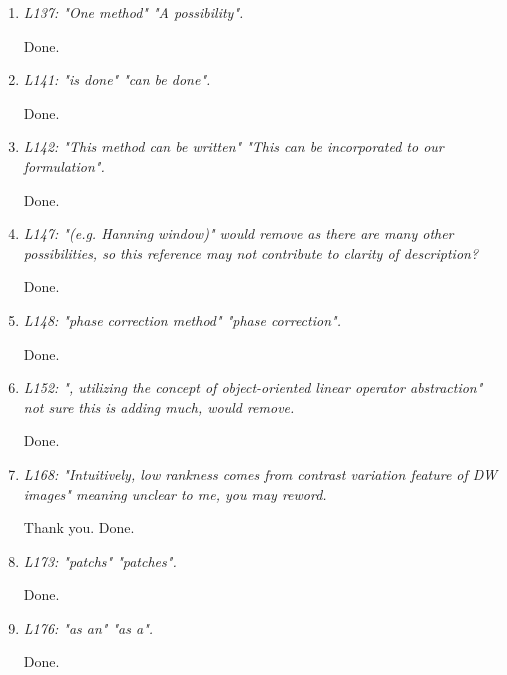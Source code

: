 \documentclass[a4paper,11pt,twoside]{report}
\begin{document}
\begin{enumerate}[resume]
    \item \textit{L137: "One method" \textrightarrow "A possibility".}

    \hspace{1em} Done.

    \item \textit{L141: "is done" \textrightarrow "can be done".}

    \hspace{1em} Done.

    \item \textit{L142: "This method can be written" \textrightarrow "This can be incorporated to our formulation".}

    \hspace{1em} Done.

    \item \textit{L147: "(e.g. Hanning window)" \textrightarrow would remove as there are many other possibilities, so this reference may not contribute to clarity of description?}

    \hspace{1em} Done.

    \item \textit{L148: "phase correction method" \textrightarrow "phase correction".}

    \hspace{1em} Done.

    \item \textit{L152: ", utilizing the concept of object-oriented linear operator abstraction" \textrightarrow not sure this is adding much, would remove.}

    \hspace{1em} Done.

    \item \textit{L168: "Intuitively, low rankness comes from contrast variation feature of DW images" \textrightarrow meaning unclear to me, you may reword.}

    \hspace{1em} Thank you. Done.

    \item \textit{L173: "patchs" \textrightarrow "patches".}

    \hspace{1em} Done.

    \item \textit{L176: "as an" \textrightarrow "as a".}

    \hspace{1em} Done.


\end{enumerate}
\end{document}
